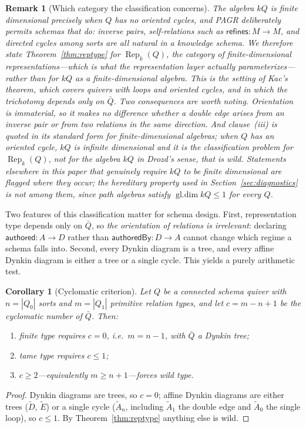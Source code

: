 \documentclass[11pt]{article}
\newtheorem{corollary}[definition]{Corollary}
\newtheorem{remark}[definition]{Remark}
\newcommand{\Rep}{\operatorname{Rep}}
\begin{document}
\begin{remark}[Which category the classification concerns]
\label{rem:fd-scope}
The algebra $kQ$ is finite dimensional precisely when $Q$ has no oriented cycles, and PAGR deliberately permits schemas that do: inverse pairs, self-relations such as $\mathsf{refines}:M\to M$, and directed cycles among sorts are all natural in a knowledge schema. We therefore state Theorem~\ref{thm:reptype} for $\Rep_k(Q)$, the category of finite-dimensional representations---which is what the representation layer actually parameterizes---rather than for $kQ$ as a finite-dimensional algebra. This is the setting of Kac's theorem, which covers quivers with loops and oriented cycles, and in which the trichotomy depends only on $\bar Q$. Two consequences are worth noting. Orientation is immaterial, so it makes no difference whether a double edge arises from an inverse pair or from two relations in the same direction. And clause~(iii) is quoted in its standard form for finite-dimensional algebras; when $Q$ has an oriented cycle, $kQ$ is infinite dimensional and it is the classification problem for $\Rep_k(Q)$, not for the algebra $kQ$ in Drozd's sense, that is wild. Statements elsewhere in this paper that genuinely require $kQ$ to be finite dimensional are flagged where they occur; the hereditary property used in Section~\ref{sec:diagnostics} is not among them, since path algebras satisfy $\operatorname{gl.dim} kQ\le1$ for every $Q$.
\end{remark}

Two features of this classification matter for schema design. First, representation type depends only on $\bar Q$, so \emph{the orientation of relations is irrelevant}: declaring $\mathsf{authored}:A\to D$ rather than $\mathsf{authoredBy}:D\to A$ cannot change which regime a schema falls into. Second, every Dynkin diagram is a tree, and every affine Dynkin diagram is either a tree or a single cycle. This yields a purely arithmetic test.

\begin{corollary}[Cyclomatic criterion]
\label{cor:cyclomatic}
Let $Q$ be a connected schema quiver with $n=|Q_0|$ sorts and $m=|Q_1|$ primitive relation types, and let $c=m-n+1$ be the cyclomatic number of $\bar Q$. Then:
\begin{enumerate}[leftmargin=*,label=(\roman*)]
    \item finite type requires $c=0$, i.e.\ $m=n-1$, with $\bar Q$ a Dynkin tree;
    \item tame type requires $c\le 1$;
    \item $c\ge 2$---equivalently $m\ge n+1$---forces wild type.
\end{enumerate}
\end{corollary}
\begin{proof}
Dynkin diagrams are trees, so $c=0$; affine Dynkin diagrams are either trees ($\tilde D$, $\tilde E$) or a single cycle ($\tilde A_n$, including $\tilde A_1$ the double edge and $\tilde A_0$ the single loop), so $c\le1$. By Theorem~\ref{thm:reptype} anything else is wild.
\end{proof}
\end{document}
